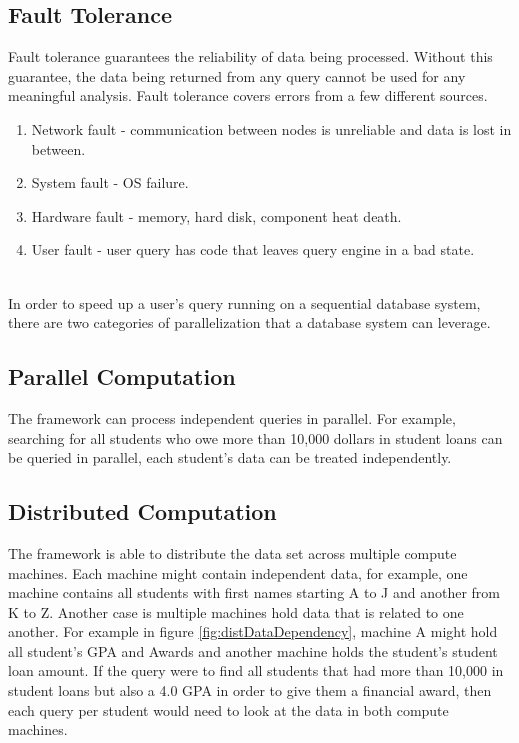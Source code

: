 \documentclass[10pt,twocolumn]{IEEEtran11}
\begin{document}
\subsection{Fault Tolerance}
Fault tolerance guarantees the reliability of data being processed.  Without this guarantee, the data being returned from any query cannot be used for any meaningful analysis.   Fault tolerance covers errors from a few different sources.
\  \\
\begin{enumerate}
	\setlength\itemsep{1em}
	\item Network fault - communication between nodes is unreliable and data is lost in between.
	\item System fault - OS failure.
	\item Hardware fault - memory, hard disk, component heat death.
	\item User fault - user query has code that leaves query engine in a bad state.
\end{enumerate}
\  \\
In order to speed up a user's query running on a sequential database system, there are two categories of parallelization that a database system can leverage.

\subsection{Parallel Computation}
The framework can process independent queries in parallel.  For example, searching for all students who owe more than 10,000 dollars in student loans
can be queried in parallel, each student's data can be treated independently.

\subsection{Distributed Computation}
The framework is able to distribute the data set across multiple compute machines.  Each machine might contain independent data, for example, one machine contains all students with first names starting A to J and another from K to Z.  Another case is multiple machines hold data that is related to one another.  For example in figure \ref{fig:distDataDependency}, machine A might hold all student's GPA and Awards and another machine holds the student's student loan amount.
If the query were to find all students that had more than 10,000 in student loans but also a 4.0 GPA in order to give them a financial award, then each query per student would need to look at the data in both compute machines.
\end{document}

